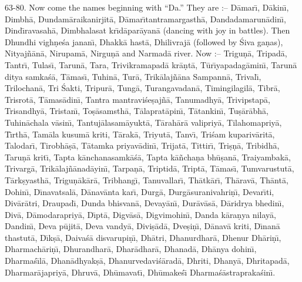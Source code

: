 63-80. Now come the names beginning with ``Da.'' They are :-- D\=amar\={\i}, D\=akin\={\i}, Dimbh\=a, Dundam\=araikanirjit\=a, D\=amar\={\i}tantramargasth\=a, Dandadamarun\=adin\={\i}, Dind\={\i}ravasah\=a, Dimbhalasat kr\={\i}d\=apar\=ayan\=a (dancing with joy in battles). Then Dhundhi vigh\d{n}e\'sa janan\={\i}, Dhakk\=a hast\=a, Dhilivraj\=a (followed by \'Siva ga\d{n}as), Nityaj\~n\=an\=a, Nirupam\=a, Nirgu\d{n}\=a and Narmad\=a river. Now :-- Trigu\d{n}\=a, Tripad\=a, Tantr\={\i}, Tulas\={\i}, Tarun\=a, Tara, Trivikramapad\=a kr\=a\d{n}t\=a, T\=ur\={\i}yapadag\=amin\={\i}, Tarun\=a ditya samka\'s\=a, T\=amas\={\i}, Tuhin\=a, Tur\=a, Trik\=alaj\~n\=ana Sampann\=a, Trival\={\i}, Trilochan\=a, Tri \'Sakti, Tripur\=a, Tung\=a, Turangavadan\=a, Timingilagil\=a, Tibr\=a, Trisrot\=a, T\=amas\=adin\={\i}, Tantra mantravi\'se\d{s}aj\~n\=a, Tanumadhy\=a, Trivipstap\=a, Trisandhy\=a, Tristan\={\i}, To\d{s}\=asamsth\=a, T\=alaprat\=apin\={\i}, T\=atankin\={\i}, Tu\d{s}\=ar\=abh\=a, Tuhin\=achala v\=asin\={\i}, Tantuj\=alasam\=ayukt\=a, T\=arah\=ar\=a valipriy\=a, Tilahomapriy\=a, T\={\i}rth\=a, Tam\=ala kusum\=a kriti, T\=arak\=a, Triyut\=a, Tanv\={\i}, Tri\'sam kupariv\=arit\=a, Talodar\={\i}, Tirobh\=a\d{s}\=a, T\=atamka priyav\=adin\={\i}, Trijat\=a, Tittir\={\i}, Tri\d{s}\d{n}\=a, Tribidh\=a, Taru\d{n}\=a krit\={\i}, Tapta k\=anchanasamk\=a\'s\=a, Tapta k\=a\~ncha\d{n}a bh\=u\d{s}an\=a, Traiyambak\=a, Trivarg\=a, Trik\=alaj\~n\=anad\=ayin\={\i}, Tarpa\d{n}\=a, Triptid\=a, Tript\=a, T\=amas\={\i}, Tumvarustut\=a, T\=ark\d{s}yasth\=a, Trigu\d{n}\=ak\=ar\=a, Tribhang\={\i}, Tanuvallar\={\i}, Th\=atk\=ar\={\i}, Th\=arav\=a, Th\=ant\=a, Dohin\={\i}, D\={\i}navatsal\=a, D\=anav\=anta kar\={\i}, Durg\=a, Durg\=asuranivahri\d{n}\={\i}, Devar\={\i}ti, Div\=ar\=atri, Draupad\={\i}, Dunda bhisvan\=a, Devay\=an\={\i}, Dur\=av\=as\=a, D\=aridrya bhedin\={\i}, Div\=a, D\=amodarapriy\=a, D\={\i}pt\=a, Digv\=as\=a, Digvimohin\={\i}, Danda k\=ara\d{n}ya nilay\=a, Dandin\={\i}, Deva p\=ujit\=a, Deva vandy\=a, Divi\d{s}\=ad\=a, Dve\d{s}i\d{n}\={\i}, D\=anav\=a kriti, D\={\i}nan\=a thastut\=a, D\={\i}k\d{s}\=a, Daiva\'s\=a disvarupi\d{n}\={\i}, Dh\=atri, Dhanurdhar\=a, Dhenur Dh\=ari\d{n}\={\i}, Dharmach\=ari\d{n}\={\i}, Dhurandhar\=a, Dhar\=adhar\=a, Dhanad\=a, Dh\=anya dohin\={\i}, Dharma\'s\={\i}l\=a, Dhan\=adhyak\d{s}\=a, Dhanurvedavi\'s\=arad\=a, Dhriti, Dhany\=a, Dhritapad\=a, Dharmar\=ajapriy\=a, Dhruv\=a, Dh\=umavat\={\i}, Dh\=umake\'s\={\i} Dharma\'s\=astrapraka\'sin\={\i}.

